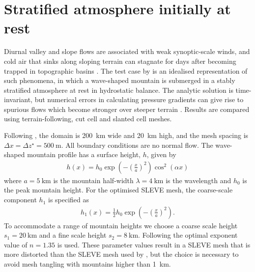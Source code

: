 \section{Stratified atmosphere initially at rest}
\label{sec:slanted:resting}


Diurnal valley and slope flows are associated with weak synoptic-scale winds, and cold air that sinks along sloping terrain can stagnate for days after becoming trapped in topographic basins \citep{chow2013}.
The test case by \citet{klemp2011} is an idealised representation of such phenomena, in which a wave-shaped mountain is submerged in a stably stratified atmosphere at rest in hydrostatic balance.  The analytic solution is time-invariant, but numerical errors in calculating pressure gradients can give rise to spurious flows which become stronger over steeper terrain \citep{klemp2011}.  Results are compared using terrain-following, cut cell and slanted cell meshes.


Following \cite{klemp2011}, the domain is \SI{200}{\kilo\meter} wide and \SI{20}{\kilo\meter} high, and the mesh spacing is \(\Delta x = \Delta z^\star = \SI{500}{\meter}\).  All boundary conditions are no normal flow.
The wave-shaped mountain profile has a surface height, $h$, given by
\begin{align}
	h(x) = h_0 \exp \left( - \left( \frac{x}{a} \right)^2 \right) \cos^2 \left( \alpha x \right) \label{eqn:resting:mountain}
\end{align}
where $a = \SI{5}{\kilo\meter}$ is the mountain half-width $\lambda = \SI{4}{\kilo\meter}$ is the wavelength and $h_0$ is the peak mountain height.  For the optimised SLEVE mesh, the coarse-scale component $h_1$ is specified as
\begin{align}
	h_1(x) = \frac{1}{2} h_0 \exp \left( - \left( \frac{x}{a} \right)^2 \right) \text{.}
\end{align}
To accommodate a range of mountain heights we choose a coarse scale height $s_1 = \SI{20}{\kilo\meter}$ and a fine scale height $s_2 = \SI{8}{\kilo\meter}$.  Following \citet{leuenberger2010} the optimal exponent value of $n = \num{1.35}$ is used.  These parameter values result in a SLEVE mesh that is more distorted than the SLEVE mesh used by \citet{klemp2011}, but the choice is necessary to avoid mesh tangling with mountains higher than \SI{1}{\kilo\meter}.

